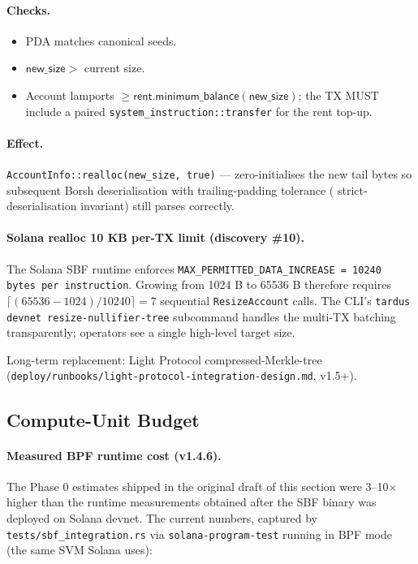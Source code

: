 \paragraph{Checks.}
\begin{itemize}[leftmargin=2em,itemsep=0pt]
  \item PDA matches canonical seeds.
  \item $\mathsf{new\_size} >$ current size.
  \item Account lamports $\geq \mathsf{rent.minimum\_balance(new\_size)}$;
    the TX MUST include a paired \texttt{system\_instruction::transfer}
    for the rent top-up.
\end{itemize}

\paragraph{Effect.} \texttt{AccountInfo::realloc(new\_size, true)} —
zero-initialises the new tail bytes so subsequent Borsh
deserialisation with trailing-padding tolerance
( strict-deserialisation invariant) still
parses correctly.

\paragraph{Solana realloc 10 KB per-TX limit (discovery \#10).}
The Solana SBF runtime enforces \texttt{MAX\_PERMITTED\_DATA\_INCREASE
= 10240 bytes per instruction}. Growing from 1024 B to 65536 B
therefore requires $\lceil (65536 - 1024)/10240 \rceil = 7$ sequential
\texttt{ResizeAccount} calls. The CLI's
\texttt{tardus devnet resize-nullifier-tree} subcommand handles the
multi-TX batching transparently; operators see a single high-level
target size.

Long-term replacement: Light Protocol compressed-Merkle-tree
(\texttt{deploy/runbooks/light-protocol-integration-design.md}, v1.5+).

\subsection{Compute-Unit Budget}
\label{sec:onchain-cu}

\paragraph{Measured BPF runtime cost (v1.4.6).} The Phase 0 estimates
shipped in the original draft of this section were 3--10$\times$
higher than the runtime measurements obtained after the SBF binary
was deployed on Solana devnet. The current numbers, captured by
\texttt{tests/sbf\_integration.rs} via \texttt{solana-program-test}
running in BPF mode (the same SVM Solana uses):

